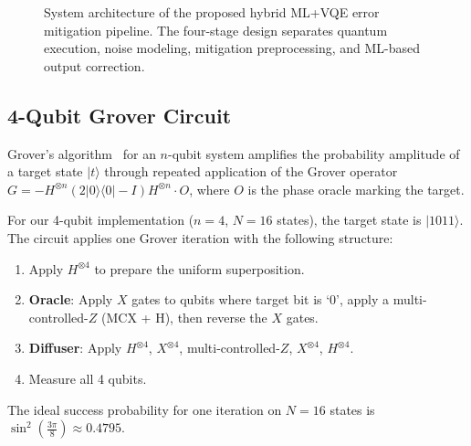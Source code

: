 \documentclass[journal]{IEEEtran}
\begin{document}
\begin{figure}[ht]
\centering
{}
\caption{System architecture of the proposed hybrid ML+VQE error mitigation pipeline. The four-stage design separates quantum execution, noise modeling, mitigation preprocessing, and ML-based output correction.}
\label{fig:arch}
\end{figure}

\subsection{4-Qubit Grover Circuit}

Grover's algorithm~\cite{grover1996} for an $n$-qubit system amplifies the probability amplitude of a target state $|t\rangle$ through repeated application of the Grover operator $G = -H^{\otimes n}(2|0\rangle\langle0| - I)H^{\otimes n} \cdot O$, where $O$ is the phase oracle marking the target.

For our 4-qubit implementation ($n = 4$, $N = 16$ states), the target state is $|1011\rangle$. The circuit applies one Grover iteration with the following structure:
\begin{enumerate}
  \item Apply $H^{\otimes 4}$ to prepare the uniform superposition.
  \item \textbf{Oracle}: Apply $X$ gates to qubits where target bit is `0', apply a multi-controlled-$Z$ (MCX + H), then reverse the $X$ gates.
  \item \textbf{Diffuser}: Apply $H^{\otimes 4}$, $X^{\otimes 4}$, multi-controlled-$Z$, $X^{\otimes 4}$, $H^{\otimes 4}$.
  \item Measure all 4 qubits.
\end{enumerate}
The ideal success probability for one iteration on $N = 16$ states is $\sin^2\!\left(\frac{3\pi}{8}\right) \approx 0.4795$.
\end{document}

